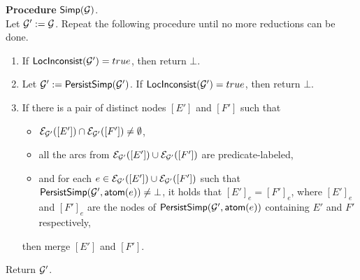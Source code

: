 \documentclass{llncs}
\begin{document}
\medskip
\noindent
{\bf Procedure} ${\sf Simp}(\mathcal{G})$.\\
Let $\mathcal{G}':=\mathcal{G}$. Repeat the following procedure until no more reductions can be done.
\begin{enumerate}
\item If ${\sf LocInconsist}(\mathcal{G}') = true$, then return $\bot$.
%
\item Let $\mathcal{G}':={\sf PersistSimp}(\mathcal{G}')$. If ${\sf LocInconsist}(\mathcal{G}') = true$, then return $\bot$.
%
\item If there is a pair of distinct nodes $[E']$ and $[F']$ such that 
\begin{itemize}
\item $\mathcal{E}_{\mathcal{G}'}([E']) \cap \mathcal{E}_{\mathcal{G}'}([F']) \neq \emptyset$, 
\item all the arcs from $ \mathcal{E}_{\mathcal{G}'}([E']) \cup \mathcal{E}_{\mathcal{G}'}([F'])$  are predicate-labeled, 
\item and for each $e \in \mathcal{E}_{\mathcal{G}'}([E']) \cup \mathcal{E}_{\mathcal{G}'}([F'])$ such that ${\sf PersistSimp}(\mathcal{G}', \mathsf{atom}(e)) \neq \bot$,  it holds that $[E']_e =[F']_e$, where $[E']_e$ and $[F']_e$ are the nodes of  ${\sf PersistSimp}(\mathcal{G}', \mathsf{atom}(e))$ containing $E'$ and $F'$ respectively, 
\end{itemize}
then merge $[E']$ and $[F']$. 
%
\end{enumerate}
Return $\mathcal{G}'$.

\medskip

\end{document}
